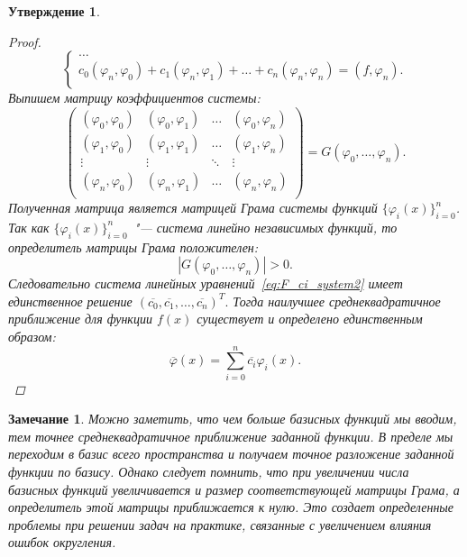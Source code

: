 \documentclass[11pt,a4paper,twoside]{report}
\numberwithin{equation}{section}
\newtheorem*{statement}{Утверждение}
\theoremstyle{definition}
\theoremstyle{plain}
\newtheorem{note}{Замечание}[section]
\begin{document}
\begin{statement}
\begin{proof}
\begin{equation}
\begin{cases}
                \dots \\
                c_0(\varphi_n, \varphi_0) + c_1 (\varphi_n, \varphi_1) +
                \ldots + c_n (\varphi_n, \varphi_n) = (f, \varphi_n). \\
            \end{cases}
        \end{equation}
        Выпишем матрицу коэффициентов системы:
        $$
        \begin{pmatrix}
            (\varphi_0, \varphi_0) & (\varphi_0, \varphi_1) & \dots &
            (\varphi_0, \varphi_n) \\
            (\varphi_1, \varphi_0) & (\varphi_1, \varphi_1) & \dots &
            (\varphi_1, \varphi_n) \\
            \vdots & \vdots & \ddots & \vdots \\
            (\varphi_n, \varphi_0) & (\varphi_n, \varphi_1) & \dots &
            (\varphi_n, \varphi_n) \\
        \end{pmatrix}
        = G(\varphi_0, \ldots, \varphi_n).
        $$
        Полученная матрица является матрицей Грама системы функций
        $\{\varphi_i(x)\}_{i=0}^n$. Так как $\{\varphi_i(x)\}_{i=0}^n$~"--- система линейно независимых
        функций, то определитель матрицы Грама положителен:
        $$
            |G(\varphi_0, \ldots, \varphi_n)| > 0.
        $$
        Следовательно система линейных уравнений~\eqref{eq:F_ci_system2} имеет
        единственное решение $(\overline{c_0}, \overline{c_1}, \dots, \overline{c_n})^T.$
        Тогда наилучшее среднеквадратичное приближение для функции $f(x)$ существует
        и определено единственным образом:
        $$
            \overline{\varphi}(x) = \sum_{i=0}^n \overline{c_i} \varphi_i(x).
        $$
    \end{proof}
%
\end{statement}
%
%
\begin{note}
%
Можно заметить, что чем больше базисных функций мы вводим, тем
точнее среднеквадратичное приближение заданной функции. В пределе
мы переходим в базис всего пространства и получаем точное разложение заданной
функции по базису. Однако следует помнить, что при увеличении числа
базисных функций увеличивается и размер соответствующей матрицы Грама, а
определитель этой матрицы приближается к нулю. Это создает определенные
проблемы при решении задач на практике, связанные с увеличением
влияния ошибок округления.
%
\end{note}
\end{document}
